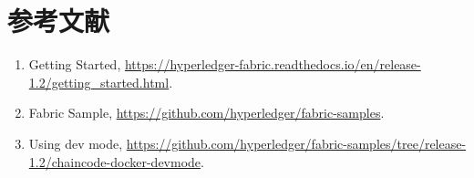 \documentclass[11pt]{article}
\begin{document}
\section{参考文献}
\label{sec-4}
\begin{enumerate}
\item Getting Started, \url{https://hyperledger-fabric.readthedocs.io/en/release-1.2/getting_started.html}.
\item Fabric Sample, \url{https://github.com/hyperledger/fabric-samples}.
\item Using dev mode, \url{https://github.com/hyperledger/fabric-samples/tree/release-1.2/chaincode-docker-devmode}.
\end{enumerate}
\end{document}

